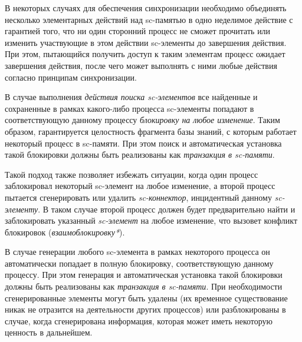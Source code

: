 \begin{frame}{}
	\topline
	\justifying
	\vspace{10mm}
	
В некоторых случаях для обеспечения синхронизации необходимо объединять несколько элементарных действий над sc-памятью в одно неделимое действие с гарантией того, что ни один сторонний процесс не сможет прочитать или изменить участвующие в этом действии sc-элементы до завершения действия. При этом, пытающийся получить доступ к таким элементам процесс ожидает завершения действия, после чего может выполнять с ними любые действия согласно принципам синхронизации.

В случае выполнения \textit{действия поиска sc-элементов} все найденные и сохраненные в рамках какого-либо процесса sc-элементы попадают в соответствующую данному процессу \textit{блокировку на любое изменение}. Таким образом, гарантируется целостность фрагмента базы знаний, с которым работает некоторый процесс в sc-памяти. При этом поиск и автоматическая установка такой блокировки должны быть реализованы как \textit{транзакция в sc-памяти}.
	
\end{frame}

\begin{frame}{}
	\topline
	\justifying
	\vspace{10mm}
	
Такой подход также позволяет избежать ситуации, когда один процесс заблокировал некоторый sc-элемент на любое изменение, а второй процесс пытается сгенерировать или удалить \textit{sc-коннектор}, инцидентный данному \textit{sc-элементу}. В таком случае второй процесс должен будет предварительно найти и заблокировать указанный \textit{sc-элемент} на любое изменение, что вызовет конфликт блокировок (\textit{взаимоблокировку*}).

В случае генерации любого sc-элемента в рамках некоторого процесса он автоматически попадает в полную блокировку, соответствующую данному процессу. При этом генерация и автоматическая установка такой блокировки должны быть реализованы как \textit{транзакция в sc-памяти}. При необходимости сгенерированные элементы могут быть удалены (их временное существование никак не отразится на деятельности других процессов) или разблокированы в случае, когда сгенерирована информация, которая может иметь некоторую ценность в дальнейшем.
\end{frame}

